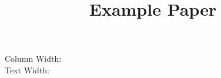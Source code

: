 \documentclass[sigconf,nonacm]{acmart}
\title{Example Paper}
\begin{document}
\maketitle

Column Width: \the\columnwidth\\
Text Width: \the\textwidth
\newpage

	
	
\end{document}
